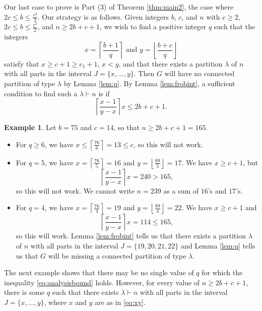 \documentclass[12pt]{amsart}  %
\theoremstyle{definition}
\newtheorem{example}[theorem]{Example}
\theoremstyle{remark}
\numberwithin{equation}{section}
\begin{document}
Our last case to prove is Part (3) of Theorem \ref{thm:main2}, the case where $2c\leq b\leq\frac{c^2}2$. Our strategy is as follows. Given integers $b$, $c$, and $n$ with $c\geq 2$, $2c\leq b\leq\frac{c^2}2$, and $n\geq 2b+c+1$, we wish to find a positive integer $q$ such that the integers 
\begin{equation}\label{eq:xy}
x=\left\lceil\frac{b+1}q\right\rceil\text{ and }y=\left\lfloor\frac{b+c}q\right\rfloor
\end{equation} satisfy that $x\geq c+1\geq c_1+1$, $x<y$, and that there exists a partition $\lambda$ of $n$ with all parts in the interval $J=\{x,\ldots,y\}$. Then $G$ will have no connected partition of type $\lambda$ by Lemma \ref{lem:q}. By Lemma \ref{lem:frobint}, a sufficient condition to find such a $\lambda\vdash n$ is if \begin{equation}\label{eq:analysisbound}
\left\lceil\frac{x-1}{y-x}\right\rceil x\leq 2b+c+1.\end{equation}

\begin{example}\label{ex:oneq}
Let $b=75$ and $c=14$, so that $n\geq 2b+c+1=165$. 
\begin{itemize}
\item For $q\geq 6$, we have $x\leq\left\lceil\frac{76}6\right\rceil=13\leq c$, so this will not work.
\item For $q=5$, we have $x=\left\lceil\frac{76}5\right\rceil=16$ and $y=\left\lfloor\frac{89}5\right\rfloor=17$. We have $x\geq c+1$, but 
\begin{equation*}
\left\lceil\frac{x-1}{y-x}\right\rceil x=240>165,
\end{equation*}
so this will not work. We cannot write $n=239$ as a sum of $16$'s and $17$'s.
\item For $q=4$, we have $x=\left\lceil\frac{76}4\right\rceil=19$ and $y=\left\lfloor\frac{89}4\right\rfloor=22$. We have $x\geq c+1$ and 
\begin{equation*}
\left\lceil\frac{x-1}{y-x}\right\rceil x=114\leq 165,
\end{equation*} so this will work. Lemma \ref{lem:frobint} tells us that there exists a partition $\lambda$ of $n$ with all parts in the interval $J=\{19,20,21,22\}$ and Lemma \ref{lem:q} tells us that $G$ will be missing a connected partition of type $\lambda$. 
\end{itemize}
\end{example}

The next example shows that there may be no single value of $q$ for which the inequality \eqref{eq:analysisbound} holds. However, for every value of $n\geq 2b+c+1$, there is some $q$ such that there exists $\lambda\vdash n$ with all parts in the interval $J=\{x,\ldots,y\}$, where $x$ and $y$ are as in \eqref{eq:xy}.
\end{document}
